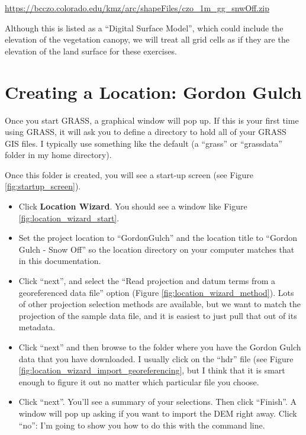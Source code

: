\documentclass{book}
\begin{document}
\url{https://bcczo.colorado.edu/kmz/arc/shapeFiles/czo_1m_gg_snwOff.zip}

Although this is listed as a ``Digital Surface Model'', which could include the elevation of the vegetation canopy, we will treat all grid cells as if they are the elevation of the land surface for these exercises.

\section{Creating a Location: Gordon Gulch \label{s:CreateLocation}}

Once you start GRASS, a graphical window will pop up. If this is your first time using GRASS, it will ask you to define a directory to hold all of your GRASS GIS files. I typically use something like the default (a ``grass'' or ``grassdata'' folder in my home directory).

Once this folder is created, you will see a start-up screen (see Figure \ref{fig:startup_screen}).

\begin{itemize}
	\item Click {\bf Location Wizard}. You should see a window like Figure \ref{fig:location_wizard_start}.
	\item Set the project location to ``GordonGulch'' and the location title to ``Gordon Gulch - Snow Off'' so the location directory on your computer matches that in this documentation.
	\item Click ``next'', and select the ``Read projection and datum terms from a georeferenced data file'' option (Figure \ref{fig:location_wizard_method}). Lots of other projection selection methods are available, but we want to match the projection of the sample data file, and it is easiest to just pull that out of its metadata.
	\item Click ``next'' and then browse to the folder where you have the Gordon Gulch data that you have downloaded. I usually click on the ``hdr'' file (see Figure \ref{fig:location_wizard_import_georeferencing}, but I think that it is smart enough to figure it out no matter which particular file you choose.
	\item Click ``next''. You'll see a summary of your selections. Then click ``Finish''. A window will pop up asking if you want to import the DEM right away. Click ``no'': I'm going to show you how to do this with the command line.
\end{itemize}
\end{document}
